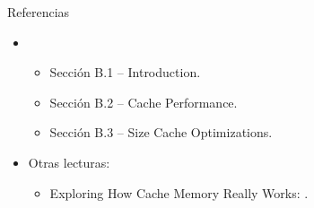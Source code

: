 \begin{frame}[t]{Referencias}
\begin{itemize}
  \item \bibhennessy
    \begin{itemize}
       \item Sección B.1 -- Introduction.
       \item Sección B.2 -- Cache Performance.
       \item Sección B.3 -- Size Cache Optimizations.
    \end{itemize}

  \item Otras lecturas:
    \begin{itemize}
      \item Exploring How Cache Memory Really Works:
            .
    \end{itemize}
\end{itemize}
\end{frame}
